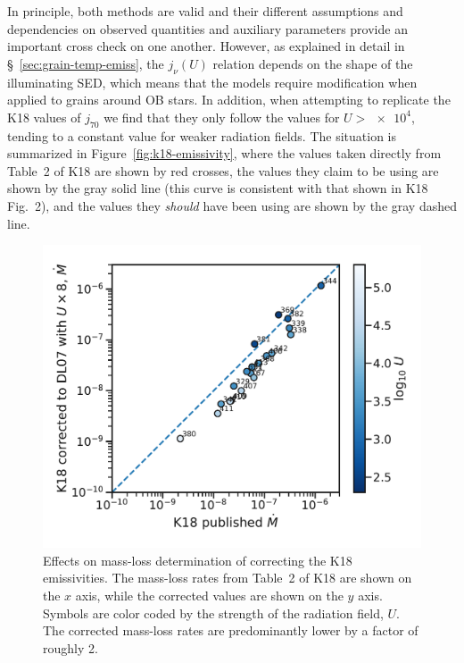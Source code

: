 In principle, both methods are valid and their different assumptions
and dependencies on observed quantities and auxiliary parameters
provide an important cross check on one another.  However, as
explained in detail in \S~\ref{sec:grain-temp-emiss}, the
\(j_\nu(U)\) relation depends on the shape of the illuminating SED,
which means that the \citet{Draine:2007a} models require modification
when applied to grains around OB stars.  In addition, when attempting
to replicate the K18 values of \(j_{70}\) we find that they only
follow the \citet{Draine:2007a} values for \(U > \num{e4}\), tending
to a constant value for weaker radiation fields.  The situation is
summarized in Figure~\ref{fig:k18-emissivity}, where the values taken
directly from Table~2 of K18 are shown by red crosses, the values they
claim to be using are shown by the gray solid line (this curve is
consistent with that shown in K18 Fig.~2), and the values they
\textit{should} have been using are shown by the gray dashed line.


\begin{figure}
  \centering
  \includegraphics[width=\linewidth]{figs/K18-mdot-Ux8-comparison}
  \caption{Effects on mass-loss determination of correcting the K18
    emissivities.  The mass-loss rates from Table~2 of K18 are shown
    on the \(x\) axis, while the corrected values are shown on the
    \(y\) axis.  Symbols are color coded by the strength of the
    radiation field, \(U\). The corrected mass-loss rates are
    predominantly lower by a factor of roughly 2.}
  \label{fig:k18-mdot-corrected-emissivity}
\end{figure}

